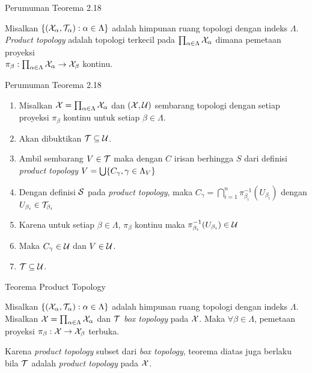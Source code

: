 \begin{frame}{Perumuman Teorema 2.18}
    \begin{tcolorbox}[enhanced,title=Teorema 2.33, frame style tile={width=\paperwidth}{\wallpaper}]
        Misalkan $\set*{\oio*{\nX_\alpha,\nT_\alpha}:\alpha \in \Lambda}$ adalah himpunan ruang topologi
        dengan indeks $\Lambda$. \textit{Product topology} adalah topologi terkecil pada $\prod_{\alpha \in \Lambda}\nX_\alpha$ 
        dimana pemetaan proyeksi \\$\pi_\beta:\prod_{\alpha \in \Lambda}\nX_\alpha \to \nX_\beta$ kontinu.
    \end{tcolorbox}
\end{frame}

\begin{frame}{Perumuman Teorema 2.18}
    \begin{tcolorbox}[enhanced,title=Teorema 2.33 (Bukti), frame style tile={width=\paperwidth}{\wallpaper}]
        \begin{enumerate}
            \item Misalkan $\nX = \prod_{\alpha\in\Lambda} \nX_\alpha$ dan $(\nX,\nU)$ sembarang topologi dengan
            setiap proyeksi $\pi_\beta$ kontinu untuk setiap $\beta \in \Lambda$.
            \item Akan dibuktikan $\nT \subseteq \nU$.
            \item Ambil sembarang $V \in \nT$ maka dengan $C$ irisan berhingga $S$ dari definisi 
            \textit{product topology} $V=\bigcup\set*{C_\gamma,\gamma\in\Lambda_V}$
            \item Dengan definisi $\nS$ pada \textit{product topology}, maka 
            $C_\gamma=\bigcap_{i=1}^n \pi_{\beta_i}^{-1}(U_{\beta_i})$ dengan $U_{\beta_i}\in\nT_{\beta_i}$
            \item Karena untuk setiap $\beta\in\Lambda$, $\pi_\beta$ kontinu maka $\pi_{\beta_i}^{-1}(U_{\beta_i}) \in \nU$
            \item Maka $C_\gamma \in \nU$ dan $V \in \nU$.
            \item $\nT \subseteq \nU$.
        \end{enumerate}
    \end{tcolorbox}
\end{frame}

\begin{frame}{Teorema Product Topology}
    \begin{tcolorbox}[enhanced,title=Teorema 2.34, frame style tile={width=\paperwidth}{\wallpaper}]
        Misalkan $\set*{\oio*{\nX_\alpha,\nT_\alpha}:\alpha \in \Lambda}$ adalah himpunan ruang topologi
        dengan indeks $\Lambda$. Misalkan $\nX = \prod_{\alpha \in \Lambda}\nX_\alpha$ dan $\nT$ \textit{box topology} pada $\nX$.
        Maka $\forall \beta\in\Lambda$, pemetaan proyeksi $\pi_\beta:\nX \to \nX_\beta$ terbuka.
    \end{tcolorbox}
    Karena \textit{product topology} subset dari \textit{box topology}, teorema diatas juga 
    berlaku bila $\nT$ adalah \textit{product topology} pada $\nX$.
\end{frame}

